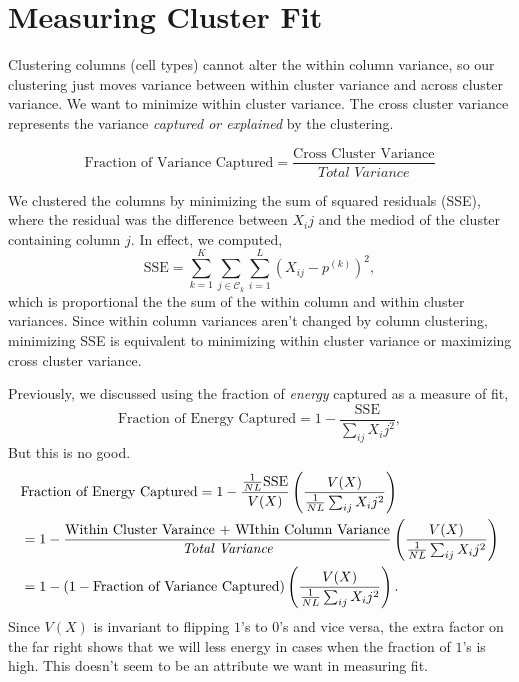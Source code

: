 \documentclass{article}
\newcommand{\CC}{\mathcal{C}}
\begin{document}
\section{Measuring Cluster Fit}
	
	Clustering columns (cell types) cannot alter the within column variance, so our clustering just moves variance between within cluster variance and across cluster variance.  We want to minimize within cluster variance.  The cross cluster variance represents the variance \textit{captured or explained} by the clustering.
	
\begin{equation}
\text{Fraction of Variance Captured} = \frac{\text{Cross Cluster Variance}}{\textit{Total Variance}}
\end{equation}

	We clustered the columns by minimizing the sum of squared residuals (SSE), where the residual was the difference between $X_ij$ and the mediod of the cluster containing column $j$.   In effect, we computed,
\begin{equation}
\text{SSE} =  \sum_{k=1}^K \sum_{j \in \CC_k} \sum_{i=1}^L  \left( X_{ij} - p^{(k)} \right)^2,
\end{equation}
which is proportional the the sum of the within column and within cluster variances.  Since within column variances aren't changed by column clustering, minimizing SSE is equivalent to minimizing within cluster variance or maximizing cross cluster variance.

	Previously, we discussed using the fraction of \textit{energy} captured as a measure of fit,
\begin{equation}
\text{Fraction of Energy Captured} =  1 - \frac{\text{SSE}}{\sum_{ij} X_ij^2},
\end{equation}
But this is no good.
\begin{align}
& \text{Fraction of Energy Captured} 
 = 1 - \frac{\frac{1}{NL} \text{SSE}}{V(X)} \left(\frac{V(X)}{\frac{1}{NL} \sum_{ij} X_ij^2} \right)
\\ \notag &
= 1 - \frac{\text{Within Cluster Varaince + WIthin Column Variance}}{\textit{Total Variance}}
\left(\frac{V(X)}{\frac{1}{NL} \sum_{ij} X_ij^2} \right)
\\ \notag &
= 1 - \left(1 - \text{Fraction of Variance Captured}\right) 
\left(\frac{V(X)}{\frac{1}{NL} \sum_{ij} X_ij^2} \right).
\end{align}
Since $V(X)$ is invariant to flipping $1$'s to $0$'s and vice versa, the extra factor on the far right shows that we will  less energy in cases when the fraction of $1$'s is high.  This doesn't seem to be an attribute we want in measuring fit.
\end{document}
